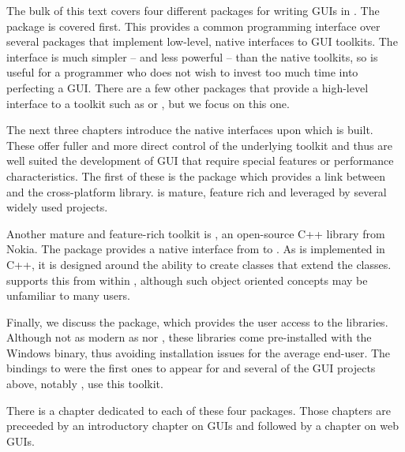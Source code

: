 
The bulk of this text covers four different packages for writing GUIs
in \R. The  package is covered first. This provides a
common programming interface over several \R\/ packages that implement
low-level, native interfaces to GUI toolkits. The 
interface is much simpler -- and less powerful -- than the native
toolkits, so is useful for a programmer who does not wish to invest
too much time into perfecting a GUI. There are a few other packages
that provide a high-level \R\/ interface to a toolkit such as
 or , but we focus on this one.


The next three chapters introduce the native interfaces upon which
 is built. These offer fuller and more direct control of
the underlying toolkit and thus are well suited the development of GUI
that require special features or performance characteristics.  The
first of these is the  package which provides a link
between \R\/ and the cross-platform \GTK\/ library. \GTK\/ is mature,
feature rich and leveraged by several widely used
projects. 

Another mature and feature-rich toolkit is \Qt, an open-source C++ library
from Nokia. The \R\/ package  provides a native interface
from \R\/ to \Qt.  As \Qt\/ is implemented in C++, it is designed
around the ability to create classes that extend the \Qt\/
classes.  supports this from within \R\/, although such
object oriented concepts may be unfamiliar to many \R\/ users.

Finally, we discuss the  package, which provides the \R\/
user access to the \TK\/ libraries. Although not as modern as \GTK\/
nor \Qt, these libraries come pre-installed with the Windows binary,
thus avoiding installation issues for the average end-user. The
bindings to \TK\/ were the first ones to appear for \R\/ and 
several of the GUI projects above, notably , use this
toolkit.

There is a chapter dedicated to each of these four packages. Those
chapters are preceeded by an introductory chapter on GUIs and followed
by a chapter on web GUIs.

